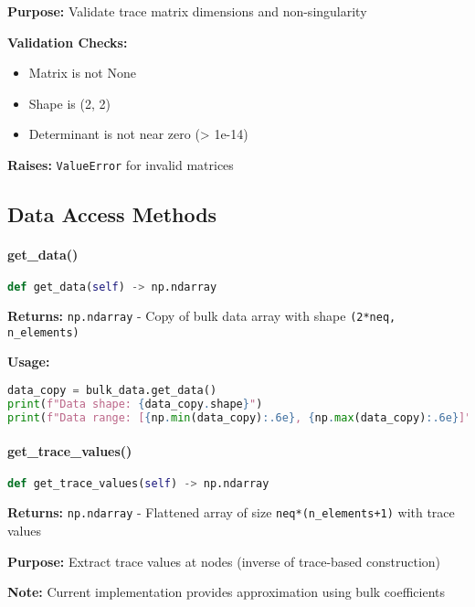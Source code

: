 \textbf{Purpose:} Validate trace matrix dimensions and non-singularity

\textbf{Validation Checks:}
\begin{itemize}
    \item Matrix is not None
    \item Shape is (2, 2)
    \item Determinant is not near zero (> 1e-14)
\end{itemize}

\textbf{Raises:} \texttt{ValueError} for invalid matrices

\subsection{Data Access Methods}
\label{subsec:data_access_methods}

\paragraph{get\_data()}\leavevmode
\begin{lstlisting}[language=Python, caption=Get Data Method]
def get_data(self) -> np.ndarray
\end{lstlisting}

\textbf{Returns:} \texttt{np.ndarray} - Copy of bulk data array with shape \texttt{(2*neq, n\_elements)}

\textbf{Usage:}
\begin{lstlisting}[language=Python, caption=Get Data Usage]
data_copy = bulk_data.get_data()
print(f"Data shape: {data_copy.shape}")
print(f"Data range: [{np.min(data_copy):.6e}, {np.max(data_copy):.6e}]")
\end{lstlisting}

\paragraph{get\_trace\_values()}\leavevmode
\begin{lstlisting}[language=Python, caption=Get Trace Values Method]
def get_trace_values(self) -> np.ndarray
\end{lstlisting}

\textbf{Returns:} \texttt{np.ndarray} - Flattened array of size \texttt{neq*(n\_elements+1)} with trace values

\textbf{Purpose:} Extract trace values at nodes (inverse of trace-based construction)

\textbf{Note:} Current implementation provides approximation using bulk coefficients

